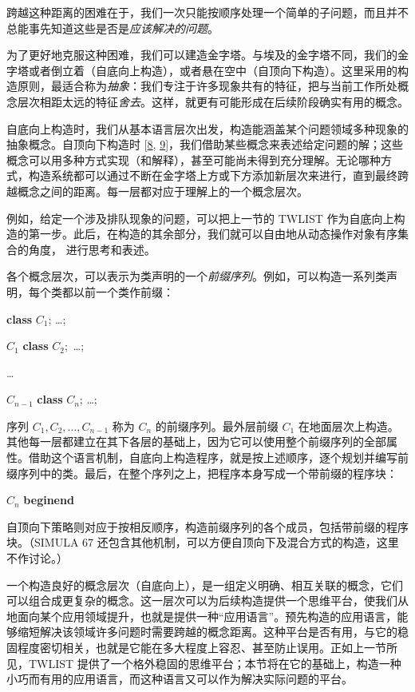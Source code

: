 \documentclass[twoside,11pt,fontset=none]{ctexbook}
\begin{document}
跨越这种距离的困难在于，我们一次只能按顺序处理一个简单的子问题，而且并不总能事先知道这些是否是\textit{应该解决的问题}。

为了更好地克服这种困难，我们可以建造金字塔。与埃及的金字塔不同，我们的金字塔或者倒立着（自底向上构造），或者悬在空中（自顶向下构造）。这里采用的构造原则，最适合称为\textit{抽象}：我们专注于许多现象共有的特征，把与当前工作所处概念层次相距太远的特征\textit{舍去}。这样，就更有可能形成在后续阶段确实有用的概念。

自底向上构造时，我们从基本语言层次出发，构造能涵盖某个问题领域多种现象的抽象概念。自顶向下构造时 [\hyperref[ref:8]{8}, \hyperref[ref:9]{9}]，我们借助某些概念来表述给定问题的解；这些概念可以用多种方式实现（和解释），甚至可能尚未得到充分理解。无论哪种方式，构造系统都可以通过不断在金字塔上方或下方添加新层次来进行，直到最终跨越概念之间的距离。每一层都对应于理解上的一个概念层次。

例如，给定一个涉及排队现象的问题，可以把上一节的 TWLIST 作为自底向上构造的第一步。此后，在构造的其余部分，我们就可以自由地从动态操作对象有序集合的角度，
进行思考和表述。

各个概念层次，可以表示为类声明的一个\textit{前缀序列}。例如，可以构造一系列类声明，每个类都以前一个类作前缀：

\hfill\textbf{class} $C_1$; \dots;\hspace{14em}

\hfill $C_1$ \textbf{class} $C_2;$ \dots;\hspace{14em}

\tabto*{13em}\dots

\hfill $C_{n - 1}$ \textbf{class} $C_n$; \dots;\hspace{14em}

\noindent
序列 $C_1, C_2, \dots, C_{n-1}$ 称为 $C_n$ 的前缀序列。最外层前缀 $C_1$ 在地面层次上构造。其他每一层都建立在其下各层的基础上，因为它可以使用整个前缀序列的全部属性。借助这个语言机制，自底向上构造程序，就是按上述顺序，逐个规划并编写前缀序列中的类。最后，在整个序列之上，把程序本身写成一个带前缀的程序块：

\quad $C_n$ \textbf{begin}\textemdash{}\textbf{end}

\noindent
自顶向下策略则对应于按相反顺序，构造前缀序列的各个成员，包括带前缀的程序块。（SIMULA 67 还包含其他机制，可以方便自顶向下及混合方式的构造，这里不作讨论。）

一个构造良好的概念层次（自底向上），是一组定义明确、相互关联的概念，它们可以组合成更复杂的概念。这一层次可以为后续构造提供一个思维平台，使我们从地面向某个应用领域提升，也就是提供一种“应用语言”。预先构造的应用语言，能够缩短解决该领域许多问题时需要跨越的概念距离。这种平台是否有用，与它的稳固程度密切相关，也就是它能在多大程度上容忍、甚至防止误用。正如上一节所见，TWLIST 提供了一个格外稳固的思维平台；本节将在它的基础上，构造一种小巧而有用的应用语言，而这种语言又可以作为解决实际问题的平台。
\end{document}
